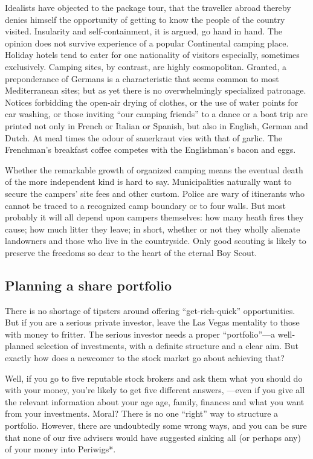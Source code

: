 \documentclass[11pt]{article}
\begin{document}
Idealists have objected to the package tour, that the traveller abroad thereby denies himself the opportunity of getting to know the people of the country visited. Insularity and self-containment, it is argued, go hand in hand. The opinion does not survive experience of a popular Continental camping place. Holiday hotels tend to cater for one nationality of visitors especially, sometimes exclusively. Camping sites, by contrast, are highly cosmopolitan. Granted, a preponderance of Germans is a characteristic that seems common to most Mediterranean sites; but as yet there is no overwhelmingly specialized patronage. Notices forbidding the open-air drying of clothes, or the use of water points for car washing, or those inviting ``our camping friends'' to a dance or a boat trip are printed not only in French or Italian or Spanish, but also in English, German and Dutch. At meal times the odour of sauerkraut vies with that of garlic. The Frenchman's breakfast coffee competes with the Englishman's bacon and eggs.

Whether the remarkable growth of organized camping means the eventual death of the more independent kind is hard to say. Municipalities naturally want to secure the campers' site fees and other custom. Police are wary of itinerants who cannot be traced to a recognized camp boundary or to four walls. But most probably it will all depend upon campers themselves: how many heath fires they cause; how much litter they leave; in short, whether or not they wholly alienate landowners and those who live in the countryside. Only good scouting is likely to preserve the freedoms so dear to the heart of the eternal Boy Scout.
\subsection{Planning a share portfolio}
\label{sec-2-48}

There is no shortage of tipsters around offering ``get-rich-quick'' opportunities. But if you are a serious private investor, leave the Las Vegas mentality to those with money to fritter. The serious investor needs a proper ``portfolio''---a well-planned selection of investments, with a definite structure and a clear aim. But exactly how does a newcomer to the stock market go about achieving that?

Well, if you go to five reputable stock brokers and ask them what you should do with your money, you're likely to get five different answers, ---even if you give all the relevant information about your age age, family, finances and what you want from your investments. Moral? There is no one ``right'' way to structure a portfolio. However, there are undoubtedly some wrong ways, and you can be sure that none of our five advisers would have suggested sinking all (or perhaps any) of your money into Periwigs*.
\end{document}
